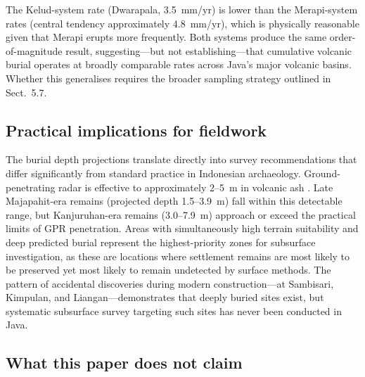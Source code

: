 \documentclass[12pt,a4paper]{article}
\begin{document}
The Kelud-system rate (Dwarapala, 3.5~mm/yr) is lower than the Merapi-system rates (central tendency approximately 4.8~mm/yr), which is physically reasonable given that Merapi erupts more frequently. Both systems produce the same order-of-magnitude result, suggesting---but not establishing---that cumulative volcanic burial operates at broadly comparable rates across Java's major volcanic basins. Whether this generalises requires the broader sampling strategy outlined in Sect.~5.7.

\subsection{Practical implications for fieldwork}

The burial depth projections translate directly into survey recommendations that differ significantly from standard practice in Indonesian archaeology. Ground-penetrating radar is effective to approximately 2--5~m in volcanic ash \citep{conyers2004}. Late Majapahit-era remains (projected depth 1.5--3.9~m) fall within this detectable range, but Kanjuruhan-era remains (3.0--7.9~m) approach or exceed the practical limits of GPR penetration. Areas with simultaneously high terrain suitability and deep predicted burial represent the highest-priority zones for subsurface investigation, as these are locations where settlement remains are most likely to be preserved yet most likely to remain undetected by surface methods. The pattern of accidental discoveries during modern construction---at Sambisari, Kimpulan, and Liangan---demonstrates that deeply buried sites exist, but systematic subsurface survey targeting such sites has never been conducted in Java.

\subsection{What this paper does not claim}
\end{document}
